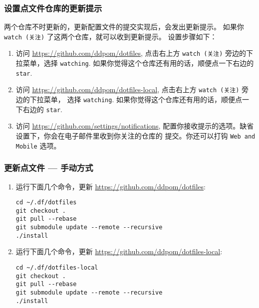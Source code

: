 \documentclass[
    11pt,
    cite=authoryear,
    device=phone,
    lang=cn,
    mode=simple,
    result=answer,
    toc=onecol,
]{elegantbook_sierxue}
\begin{document}
\subsubsection{设置点文件仓库的更新提示}%
\label{ssub:vbox-guest-ganx-conf-update-notification}

两个仓库不时更新的，更新配置文件的提交实现后，会发出更新提示。
如果你 \lstinline{watch (关注)} 了这两个仓库，就可以收到更新提示。
设置步骤如下：
\begin{enumerate}
    \item 访问 \href{https://github.com/ddpom/dotfiles}
        {https://github.com/ddpom/dotfiles}, 点击右上方
        \lstinline{watch (关注)} 旁边的下拉菜单，选择 \lstinline{watching}.
        如果你觉得这个仓库还有用的话，顺便点一下右边的 \lstinline{star}.
    \item 访问 \href{https://github.com/ddpom/dotfiles-local}
        {https://github.com/ddpom/dotfiles-local},
        点击右上方 \lstinline{watch (关注)} 旁边的下拉菜单，
        选择 \lstinline{watching}.
        如果你觉得这个仓库还有用的话，顺便点一下右边的 \lstinline{star}.
    \item 访问 \href{https://github.com/settings/notifications}
        {https://github.com/settings/notifications},
        配置你接收提示的选项。缺省设置下，你会在电子邮件里收到你关注的仓库的
        提交。你还可以打钩 \lstinline{Web and Mobile} 选项。
\end{enumerate}

\subsubsection{更新点文件 --- 手动方式}%
\label{ssub:update-dotfiles-manual}

\begin{enumerate}
    \item 运行下面几个命令，更新 \href{https://github.com/ddpom/dotfiles}
        {https://github.com/ddpom/dotfiles}:
\begin{lstlisting}[escapeinside=``]
cd ~/.df/dotfiles
git checkout .
git pull --rebase
git submodule update --remote --recursive
./install
\end{lstlisting}
    \item 运行下面几个命令，更新
        \href{https://github.com/ddpom/dotfiles-local}
        {https://github.com/ddpom/dotfiles-local}:
\begin{lstlisting}[escapeinside=``]
cd ~/.df/dotfiles-local
git checkout .
git pull --rebase
git submodule update --remote --recursive
./install
\end{lstlisting}
\end{enumerate}
\end{document}
